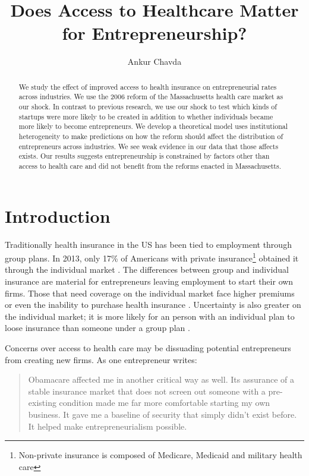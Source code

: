 \documentclass[12pt]{article}
\title{Does Access to Healthcare Matter for Entrepreneurship?}
\author{Ankur Chavda}
\begin{document}
\maketitle

\begin{abstract}
We study the effect of improved access to health insurance on entrepreneurial rates across industries. We use the 2006 reform of the Massachusetts health care market as our shock. In contrast to previous research, we use our shock to test which kinds of startups were more likely to be created in addition to whether individuals became more likely to become entrepreneurs.  We develop a theoretical model uses institutional heterogeneity to make predictions on how the reform should affect the distribution of entrepreneurs across industries. We see weak evidence in our data that those affects exists. Our results suggests entrepreneurship is constrained by factors other than access to health care and did not benefit from the reforms enacted in Massachusetts. 
\end{abstract}


\section{Introduction}
Traditionally health insurance in the US has been tied to employment through group plans. In 2013, only 17\% of Americans with private insurance\footnote{Non-private insurance is composed of Medicare, Medicaid and military health care} obtained it through the individual market \cite{census}. The differences between group and individual insurance are material for entrepreneurs leaving employment to start their own firms. Those that need coverage on the individual market face higher premiums or even the inability to purchase health insurance \cite{kaiser}. Uncertainty is also greater on the individual market; it is more likely for an person with an individual plan to loose insurance than someone under a group plan \cite{pauly}. 

Concerns over access to health care may be dissuading potential entrepreneurs from creating new firms. As one entrepreneur writes:
\begin{quote}
Obamacare affected me in another critical way as well. Its assurance of a stable insurance market that does not screen out someone with a pre-existing condition made me far more comfortable starting my own business. It gave me a baseline of security that simply didn't exist before. It helped make entrepreneurialism possible. \cite{sullivan}
\end{quote}
\end{document}
